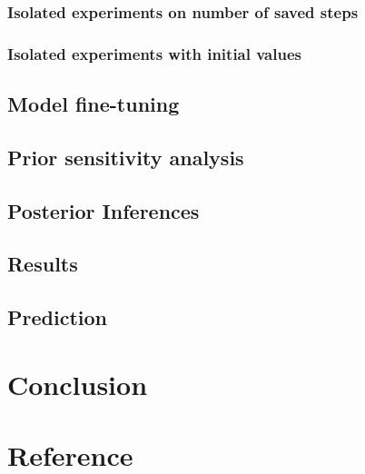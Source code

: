\documentclass[12pt]{article}
\begin{document}
\hypertarget{isolated-experiments-on-number-of-saved-steps}{%
\subsubsection{Isolated experiments on number of saved
steps}\label{isolated-experiments-on-number-of-saved-steps}}

\hypertarget{isolated-experiments-with-initial-values}{%
\subsubsection{Isolated experiments with initial
values}\label{isolated-experiments-with-initial-values}}

\hypertarget{model-fine-tuning}{%
\subsection{Model fine-tuning}\label{model-fine-tuning}}

\hypertarget{prior-sensitivity-analysis}{%
\subsection{Prior sensitivity
analysis}\label{prior-sensitivity-analysis}}

\hypertarget{posterior-inferences}{%
\subsection{Posterior Inferences}\label{posterior-inferences}}

\hypertarget{results}{%
\subsection{Results}\label{results}}

\hypertarget{prediction}{%
\subsection{Prediction}\label{prediction}}

\hypertarget{conclusion}{%
\section{Conclusion}\label{conclusion}}

\hypertarget{reference}{%
\section{Reference}\label{reference}}



\end{document}
